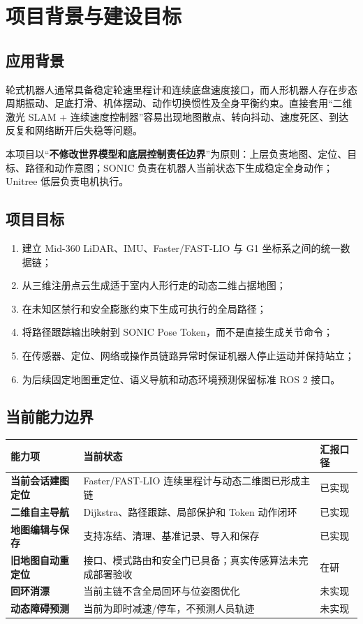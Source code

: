 \documentclass[11pt,a4paper,fontset=none]{ctexart}
\begin{document}
\section{项目背景与建设目标}

\subsection{应用背景}

轮式机器人通常具备稳定轮速里程计和连续底盘速度接口，而人形机器人存在步态周期振动、足底打滑、机体摆动、动作切换惯性及全身平衡约束。直接套用“二维激光 SLAM + 连续速度控制器”容易出现地图散点、转向抖动、速度死区、到达反复和网络断开后失稳等问题。

本项目以“\textbf{不修改世界模型和底层控制责任边界}”为原则：上层负责地图、定位、目标、路径和动作意图；SONIC 负责在机器人当前状态下生成稳定全身动作；Unitree 低层负责电机执行。

\subsection{项目目标}

\begin{enumerate}
  \item 建立 Mid-360 LiDAR、IMU、Faster/FAST-LIO 与 G1 坐标系之间的统一数据链；
  \item 从三维注册点云生成适于室内人形行走的动态二维占据地图；
  \item 在未知区禁行和安全膨胀约束下生成可执行的全局路径；
  \item 将路径跟踪输出映射到 SONIC Pose Token，而不是直接生成关节命令；
  \item 在传感器、定位、网络或操作员链路异常时保证机器人停止运动并保持站立；
  \item 为后续固定地图重定位、语义导航和动态环境预测保留标准 ROS 2 接口。
\end{enumerate}

\subsection{当前能力边界}

\begin{tabularx}{\textwidth}{>{\bfseries}p{2.9cm} X >{\raggedright\arraybackslash}p{2.6cm}}
\toprule
能力项 & 当前状态 & 汇报口径 \\
\midrule
当前会话建图定位 & Faster/FAST-LIO 连续里程计与动态二维图已形成主链 & 已实现 \\
二维自主导航 & Dijkstra、路径跟踪、局部保护和 Token 动作闭环 & 已实现 \\
地图编辑与保存 & 支持冻结、清理、基准记录、导入和保存 & 已实现 \\
旧地图自动重定位 & 接口、模式路由和安全门已具备；真实传感算法未完成部署验收 & 在研 \\
回环消漂 & 当前主链不含全局回环与位姿图优化 & 未实现 \\
动态障碍预测 & 当前为即时减速/停车，不预测人员轨迹 & 未实现 \\
\bottomrule
\end{tabularx}
\end{document}
